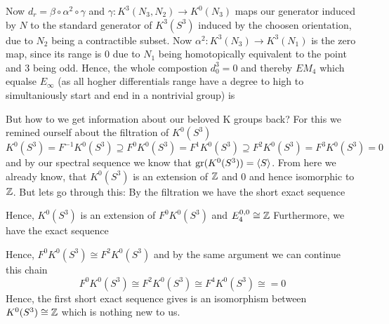 \begin{example}
	Now $d_r=\beta\circ \alpha^2\circ \gamma$ and $\gamma: K^3(N_3,N_2)\to K^0(N_3)$ maps our generator induced by $N$ to the standard generator of $K^3(S^3)$ induced by the choosen orientation, due to $N_2$ being a contractible subset. Now $\alpha^2:  K^3(N_3) \to  K^3(N_1)$ is the zero map, since its range is $0$ due to $N_1$ being homotopically equivalent to the point and $3$ being odd. Hence, the whole compostion $d^3_0=0$ and thereby $EM_4$ which equalse $E_\infty$ (as all hogher differentials range have a degree to high to simultaniously start and end in a nontrivial group) is  
	\begin{center}
	\end{center} But how to we get information about our beloved K groups back? For this we remined ourself about the filtration of $K^0(S^3)$
	\begin{equation*}
		K^0(S^3)=F^{-1}K^0(S^3)\supseteq F^0K^0(S^3)= F^1 K^0(S^3) \supseteq F^2K^0(S^3)=F^3K^0(S^3)=0
	\end{equation*} and by our spectral sequence we know that $\mathrm{gr}(K^0(S^3))=\langle S\rangle$. From here we already know, that $K^0(S^3)$ is an extension of $\mathbb{Z}$ and $0$ and hence isomorphic to $\mathbb{Z}$. But lets go through this: 
	By the filtration we have the short exact sequence
	\begin{center}
	\end{center}Hence, $K^0(S^3)$ is an extension of $F^0K^0(S^3)$ and $E^{0,0}_4\cong \mathbb{Z}$ 
	Furthermore, we have the exact sequence
	\begin{center}
	\end{center} Hence, $F^0K^0(S^3)\cong F^2K^0(S^3)$ and by the same argument we can continue this chain 
	\begin{equation*}
		F^0K^0(S^3)\cong F^2K^0(S^3)\cong F^4K^0(S^3)\cong =0
	\end{equation*}
		Hence, the first short exact sequence gives is an isomorphism between $K^0(S^3)\cong \mathbb{Z}$ which is nothing new to us. 
	\end{example} 





